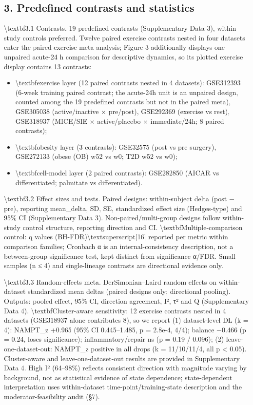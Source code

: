 \documentclass[11pt]{article}
\begin{document}
\subsection*{3. Predefined contrasts and statistics}
\textbackslash{}textbf{3.1 Contrasts.} 19 predefined contrasts (Supplementary Data 3), within-study controls preferred. Twelve paired exercise contrasts nested in four datasets enter the paired exercise meta-analysis; Figure 3 additionally displays one unpaired acute-24 h comparison for descriptive dynamics, so its plotted exercise display contains 13 contrasts:

\begin{itemize}\setlength{\itemsep}{1pt}
\item \textbackslash{}textbf{exercise layer (12 paired contrasts nested in 4 datasets)}: GSE312393 (6-week training paired contrast; the acute-24h unit is an unpaired design, counted among the 19 predefined contrasts but not in the paired meta), GSE305038 (active/inactive × pre/post), GSE292369 (exercise vs rest), GSE318937 (MICE/SIE × active/placebo × immediate/24h; 8 paired contrasts);
\item \textbackslash{}textbf{obesity layer (3 contrasts)}: GSE32575 (post vs pre surgery), GSE272133 (obese (OB) w52 vs w0; T2D w52 vs w0);
\item \textbackslash{}textbf{cell-model layer (2 paired contrasts)}: GSE282850 (AICAR vs differentiated; palmitate vs differentiated).
\end{itemize}
\textbackslash{}textbf{3.2 Effect sizes and tests.} Paired designs: within-subject delta (post − pre), reporting mean\_delta, SD, SE, standardized effect size (Hedges-type) and 95\% CI (Supplementary Data 3). Non-paired/multi-group designs follow within-study control structure, reporting direction and CI. \textbackslash{}textbf{Multiple-comparison control}: q values (BH-FDR)\textbackslash{}textsuperscript{[16]} reported per metric within comparison families; Cronbach α is an internal-consistency description, not a between-group significance test, kept distinct from significance α/FDR. Small samples (n ≤ 4) and single-lineage contrasts are directional evidence only.

\textbackslash{}textbf{3.3 Random-effects meta.} DerSimonian–Laird random effects on within-dataset standardized mean deltas (paired designs only; directional pooling). Outputs: pooled effect, 95\% CI, direction agreement, I², τ² and Q (Supplementary Data 4). \textbackslash{}textbf{Cluster-aware sensitivity}: 12 exercise contrasts nested in 4 datasets (GSE318937 alone contributes 8), so we report (1) dataset-level DL (k = 4): NAMPT\_z +0.965 (95\% CI 0.445–1.485, p = 2.8e-4, 4/4); balance −0.466 (p = 0.24, loses significance); inflammatory/repair ns (p = 0.19 / 0.096); (2) leave-one-dataset-out: NAMPT\_z positive in all drops (k = 11/10/11/4, all p < 0.05). Cluster-aware and leave-one-dataset-out results are provided in Supplementary Data 4. High I² (64–98\%) reflects consistent direction with magnitude varying by background, not as statistical evidence of state dependence; state-dependent interpretation uses within-dataset time-point/training-state description and the moderator-feasibility audit (§7).
\end{document}
